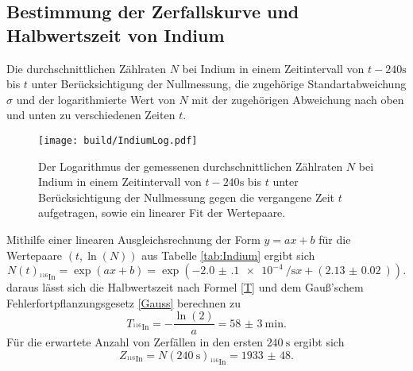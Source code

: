 \subsection{Bestimmung der Zerfallskurve und Halbwertszeit von Indium}
 \begin{table}
  \centering
  \caption{Die durchschnittlichen Zählraten $N$ bei Indium in einem Zeitintervall von $t-240\si{\second}$ bis $t$ unter Berücksichtigung der Nullmessung, die zugehörige Standartabweichung $\sigma$ und der logarithmierte Wert von $N$ mit der zugehörigen Abweichung nach oben und unten zu verschiedenen Zeiten $t$.}
  
 \end{table}
\begin{figure}
	\centering
	\texttt{[image: build/IndiumLog.pdf]}
	\caption{Der Logarithmus der gemessenen durchschnittlichen Zählraten $N$ bei Indium in einem Zeitintervall von $t-240\si{\second}$ bis $t$ unter Berücksichtigung der Nullmessung gegen die vergangene Zeit $t$ aufgetragen, sowie ein linearer Fit der Wertepaare.}
	\label{fig:Indium}
\end{figure}
Mithilfe einer linearen Ausgleichsrechnung der Form $y=a x + b$ für die Wertepaare $(t, \ln(N))$ aus Tabelle \ref{tab:Indium} ergibt sich
\begin{displaymath}
	N(t)_{^{116}\text{In}}=\exp\left(a x + b\right)=\exp\left(\SI{-2.0(1)e-4}{\per\second} x + (\SI{2.13(2)}{})\right)\text{.}
\end{displaymath}
daraus lässt sich die Halbwertszeit nach Formel \eqref{T} und dem Gauß'schem Fehlerfortpflanzungsgesetz \eqref{Gauss} berechnen zu
\begin{displaymath}
	T_{^{116}\text{In}}=-\frac{\ln(2)}{a}=\SI{58(3)}{\minute}\text{.}
\end{displaymath}
Für die erwartete Anzahl von Zerfällen in den ersten $\SI{240}{\second}$ ergibt sich
\begin{displaymath}
	Z_{^{116}\text{In}} = N(\SI{240}{\second})_{^{116}\text{In}}=\num{1933(48)}\text{.}
\end{displaymath}

